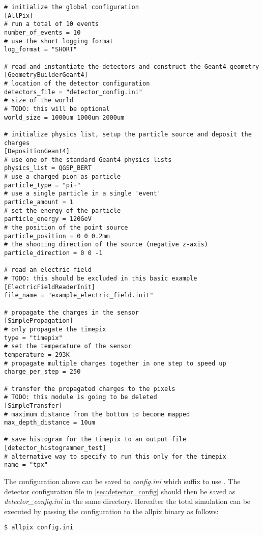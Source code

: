 \begin{verbatim}
# initialize the global configuration
[AllPix]
# run a total of 10 events
number_of_events = 10
# use the short logging format
log_format = "SHORT"

# read and instantiate the detectors and construct the Geant4 geometry
[GeometryBuilderGeant4]
# location of the detector configuration
detectors_file = "detector_config.ini"
# size of the world 
# TODO: this will be optional
world_size = 1000um 1000um 2000um

# initialize physics list, setup the particle source and deposit the charges
[DepositionGeant4]
# use one of the standard Geant4 physics lists
physics_list = QGSP_BERT
# use a charged pion as particle
particle_type = "pi+"
# use a single particle in a single 'event'
particle_amount = 1 
# set the energy of the particle 
particle_energy = 120GeV
# the position of the point source
particle_position = 0 0 0.2mm
# the shooting direction of the source (negative z-axis)
particle_direction = 0 0 -1

# read an electric field
# TODO: this should be excluded in this basic example
[ElectricFieldReaderInit]
file_name = "example_electric_field.init"

# propagate the charges in the sensor 
[SimplePropagation]
# only propagate the timepix
type = "timepix"
# set the temperature of the sensor
temperature = 293K
# propagate multiple charges together in one step to speed up
charge_per_step = 250

# transfer the propagated charges to the pixels
# TODO: this module is going to be deleted
[SimpleTransfer]
# maximum distance from the bottom to become mapped
max_depth_distance = 10um 

# save histogram for the timepix to an output file
[detector_histogrammer_test]
# alternative way to specify to run this only for the timepix
name = "tpx"
\end{verbatim}

The configuration above can be saved to \textit{config.ini} \todo which suffix to use \todo. The detector configuration file in \ref{sec:detector_config} should then be saved as \textit{detector\_config.ini} in the same directory. Hereafter the total simulation can be executed by passing the configuration to the allpix binary as follows:

\begin{verbatim}
$ allpix config.ini
\end{verbatim}

